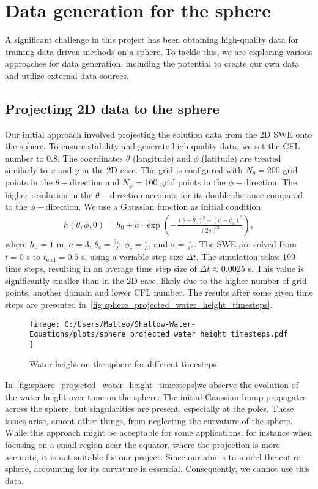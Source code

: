 \section{Data generation for the sphere}\label{sec:data_generation_sphere}
A significant challenge in this project has been obtaining high-quality data for training data-driven methods on a sphere.
To tackle this, we are exploring various approaches for data generation, including the potential to create our own data and utilize external data sources.


\subsection*{Projecting 2D data to the sphere}
Our initial approach involved projecting the solution data from the 2D SWE onto the sphere.
To ensure stability and generate high-quality data, we set the CFL number to 0.8.
The coordinates $\theta$ (longitude) and $\phi$ (latitude) are treated similarly to $x$ and $y$ in the 2D case.
The grid is configured with $N_{\theta} = 200$ grid points in the $\theta-$direction and $N_{\phi} = 100$ grid points in the $\phi-$direction.
The higher resolution in the $\theta-$direction accounts for its double distance compared to the $\phi-$direction.
We use a Gaussian function as initial condition
\begin{align*}
    h(\theta, \phi, 0) = h_0 + a \cdot \exp\left( -\frac{{(\theta - \theta_c)}^2 + {(\phi - \phi_c)}^2}{{(2\sigma)}^2} \right),
\end{align*}
where $h_0 = 1$ m, $a = 3$, $\theta_c = \frac{3 \pi}{2}, \phi_c = \frac{\pi}{3}$, and $\sigma = \frac{\pi}{16}$.
The SWE are solved from $t = 0$ s to $t_{\text{end}} = 0.5$ s, using a variable step size $\Delta t$.
The simulation takes 199 time steps, resulting in an average time step size of $\Delta t \approx 0.0025$ s.
This value is significantly smaller than in the 2D case, likely due to the higher number of grid points, another domain and lower CFL number.
The results after some given time steps are presented in~\autoref{fig:sphere_projected_water_height_timesteps}.
\begin{figure}[H]
    \centering
    \texttt{[image: C:/Users/Matteo/Shallow-Water-Equations/plots/sphere\_projected\_water\_height\_timesteps.pdf]}
    \caption{Water height on the sphere for different timesteps.}\label{fig:sphere_projected_water_height_timesteps}
\end{figure}
In~\autoref{fig:sphere_projected_water_height_timesteps}we observe the evolution of the water height over time on the sphere.
The initial Gaussian bump propagates across the sphere, but singularities are present, especially at the poles.
These issues arise, amont other things, from neglecting the curvature of the sphere. 
While this approach might be acceptable for some applications, for instance when focusing on a small region near the equator, where the projection is more accurate, it is not suitable for our project.
Since our aim is to model the entire sphere, accounting for its curvature is essential.
Consequently, we cannot use this data.

